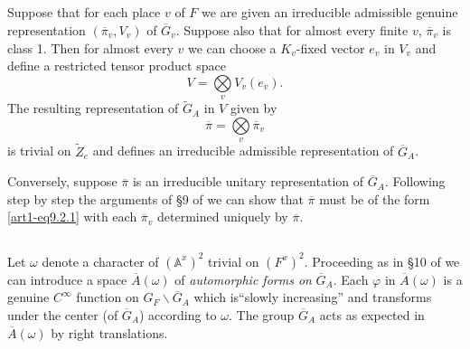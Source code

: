 \subsection{}\label{art1-sec9.2}
Suppose that for each place $v$ of $F$ we are given an irreducible admissible genuine representation $(\overline{\pi}_{v},V_{v})$ of $\overline{G}_{v}$. Suppose also that for almost every finite $v$, $\overline{\pi}_{v}$ is class 1. Then for almost every $v$ we can choose a $K_{v}$-fixed vector $e_{v}$ in $V_{v}$ and define a restricted tensor product space 
$$
V=\bigotimes\limits_{v}V_{v}(e_{v}).
$$
The resulting representation of $\widetilde{G}_{A}$ in $V$ given by
\setcounter{equation}{0}
\begin{equation}
\overline{\pi}=\bigotimes\limits_{v}\overline{\pi}_{v}\label{art1-eq9.2.1}
\end{equation}
is trivial on $\widetilde{Z}_{e}$ and defines an irreducible admissible representation of $\overline{G}_{A}$.

Conversely, suppose $\overline{\pi}$ is an irreducible unitary representation of $\overline{G}_{A}$. Following step by step the arguments of \S9 of \cite{Jacquet-Langlands} we can show that $\overline{\pi}$ must be of the form \eqref{art1-eq9.2.1} with each $\overline{\pi}_{v}$ determined uniquely by $\overline{\pi}$.

\subsection{}\label{art1-sec9.3}
Let $\omega$ denote a character of $(\mathbb{A}^{x})^{2}$ trivial on $(F^{x})^{2}$. Proceeding as in \S10 of \cite{Jacquet-Langlands} we can introduce a space $\overline{A}(\omega)$ of {\em automorphic forms on} $\overline{G}_{A}$. Each $\varphi$ in $\overline{A}(\omega)$ is a genuine $C^{\infty}$ function on $G_{F}\backslash \overline{G}_{A}$ which is\pageoriginale ``slowly increasing'' and transforms under the center (of $\overline{G}_{A}$) according to $\omega$. The group $\overline{G}_{A}$ acts as expected in $\overline{A}(\omega)$ by right translations.


